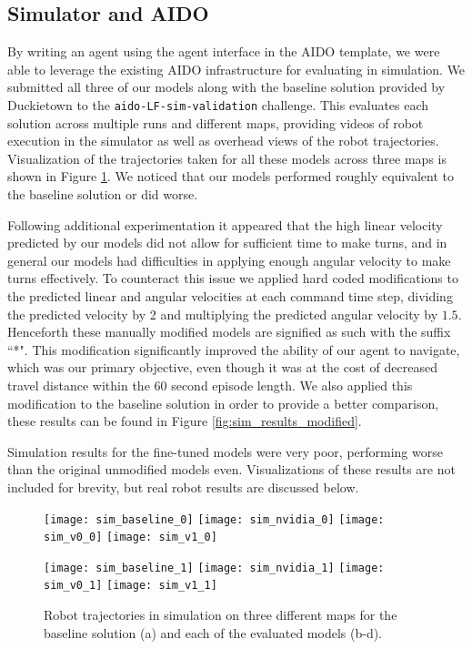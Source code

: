 \documentclass{article}
\begin{document}
\subsection{Simulator and AIDO}

By writing an agent using the agent interface in the AIDO template, we were able to leverage the existing AIDO infrastructure for evaluating in simulation. We submitted all three of our models along with the baseline solution provided by Duckietown to the \texttt{aido-LF-sim-validation} challenge. This evaluates each solution across multiple runs and different maps, providing videos of robot execution in the simulator as well as overhead views of the robot trajectories. Visualization of the trajectories taken for all these models across three maps is shown in Figure \ref{fig:sim_results_original}. We noticed that our models performed roughly equivalent to the baseline solution or did worse.

Following additional experimentation it appeared that the high linear velocity predicted by our models did not allow for sufficient time to make turns, and in general our models had difficulties in applying enough angular velocity to make turns effectively. To counteract this issue we applied hard coded modifications to the predicted linear and angular velocities at each command time step, dividing the predicted velocity by 2 and multiplying the predicted angular velocity by $1.5$. Henceforth these manually modified models are signified as such with the suffix ``*". This modification significantly improved the ability of our agent to navigate, which was our primary objective, even though it was at the cost of decreased travel distance within the 60 second episode length. We also applied this modification to the baseline solution in order to provide a better comparison, these results can be found in Figure \ref{fig:sim_results_modified}.

Simulation results for the fine-tuned models were very poor, performing worse than the original unmodified models even. Visualizations of these results are not included for brevity, but real robot results are discussed below.

\begin{figure}
    \centering
    \texttt{[image: sim\_baseline\_0]}
    \texttt{[image: sim\_nvidia\_0]}
    \texttt{[image: sim\_v0\_0]}
    \texttt{[image: sim\_v1\_0]}

    \texttt{[image: sim\_baseline\_1]}
    \texttt{[image: sim\_nvidia\_1]}
    \texttt{[image: sim\_v0\_1]}
    \texttt{[image: sim\_v1\_1]}

    \caption{Robot trajectories in simulation on three different maps for the baseline solution (a) and each of the evaluated models (b-d).}
  \label{fig:sim_results_original}
\end{figure}
\end{document}
